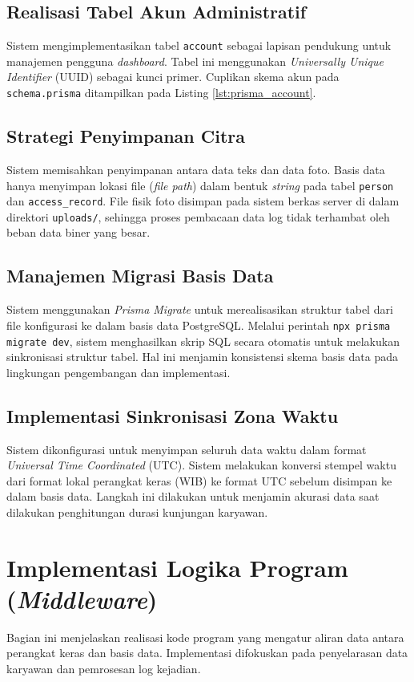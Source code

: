 \subsection{Realisasi Tabel Akun Administratif}
Sistem mengimplementasikan tabel \texttt{account} sebagai lapisan pendukung untuk manajemen pengguna \textit{dashboard}. Tabel ini menggunakan \textit{Universally Unique Identifier} (UUID) sebagai kunci primer. Cuplikan skema akun pada \texttt{schema.prisma} ditampilkan pada Listing \ref{lst:prisma_account}.



\subsection{Strategi Penyimpanan Citra}
Sistem memisahkan penyimpanan antara data teks dan data foto. Basis data hanya menyimpan lokasi file (\textit{file path}) dalam bentuk \textit{string} pada tabel \texttt{person} dan \texttt{access\_record}. File fisik foto disimpan pada sistem berkas server di dalam direktori \texttt{uploads/}, sehingga proses pembacaan data log tidak terhambat oleh beban data biner yang besar.

\subsection{Manajemen Migrasi Basis Data}
Sistem menggunakan \textit{Prisma Migrate} untuk merealisasikan struktur tabel dari file konfigurasi ke dalam basis data PostgreSQL. Melalui perintah \texttt{npx prisma migrate dev}, sistem menghasilkan skrip SQL secara otomatis untuk melakukan sinkronisasi struktur tabel. Hal ini menjamin konsistensi skema basis data pada lingkungan pengembangan dan implementasi.

\subsection{Implementasi Sinkronisasi Zona Waktu}
Sistem dikonfigurasi untuk menyimpan seluruh data waktu dalam format \textit{Universal Time Coordinated} (UTC). Sistem melakukan konversi stempel waktu dari format lokal perangkat keras (WIB) ke format UTC sebelum disimpan ke dalam basis data. Langkah ini dilakukan untuk menjamin akurasi data saat dilakukan penghitungan durasi kunjungan karyawan.

\section{Implementasi Logika Program (\textit{Middleware})}
Bagian ini menjelaskan realisasi kode program yang mengatur aliran data antara perangkat keras dan basis data. Implementasi difokuskan pada penyelarasan data karyawan dan pemrosesan log kejadian.

